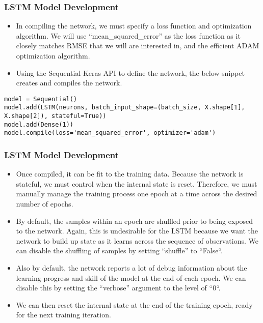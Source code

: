\begin{frame}[fragile] \frametitle{LSTM Model Development}
\begin{itemize}
\item In compiling the network, we must specify a loss function and optimization algorithm. We will use ``mean\_squared\_error'' as the loss function as it closely matches RMSE that we will are interested in, and the efficient ADAM optimization algorithm.
\item Using the Sequential Keras API to define the network, the below snippet creates and compiles the network.
\end{itemize}
\begin{lstlisting}
model = Sequential()
model.add(LSTM(neurons, batch_input_shape=(batch_size, X.shape[1], X.shape[2]), stateful=True))
model.add(Dense(1))
model.compile(loss='mean_squared_error', optimizer='adam')
\end{lstlisting} 
\end{frame}

\begin{frame}[fragile] \frametitle{LSTM Model Development}
\begin{itemize}
\item Once compiled, it can be fit to the training data. Because the network is stateful, we must control when the internal state is reset. Therefore, we must manually manage the training process one epoch at a time across the desired number of epochs.

\item By default, the samples within an epoch are shuffled prior to being exposed to the network. Again, this is undesirable for the LSTM because we want the network to build up state as it learns across the sequence of observations. We can disable the shuffling of samples by setting ``shuffle'' to ``False``.

\item Also by default, the network reports a lot of debug information about the learning progress and skill of the model at the end of each epoch. We can disable this by setting the ``verbose'' argument to the level of ``0``.

\item We can then reset the internal state at the end of the training epoch, ready for the next training iteration.
\end{itemize}

\end{frame}

